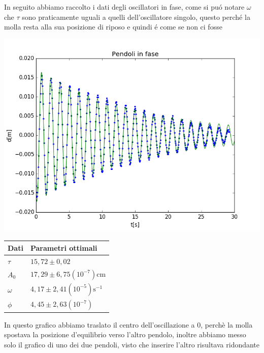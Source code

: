 \documentclass{exam}
\begin{document}
		In seguito abbiamo raccolto i dati degli oscillatori in fase, come si pu\'o notare $\omega$ che $\tau$ sono praticamente uguali a quelli dell'oscillatore singolo, questo perch\'e la molla resta alla sua posizione di riposo e quindi \'e come se non ci fosse\\
		\begin{minipage}{0.5\textwidth}
			\includegraphics[width=\textwidth]{fase}
			\end{minipage}
		\begin{minipage}{0.5\textwidth}
			\begin{tabular}{ll}
				\toprule
				Dati & Parametri ottimali \\
				\midrule
				$\tau$ & $15,72 \pm 0,02$ \\
				$A_{0}$ & $17,29 \pm 6,75(10^{-7})$cm\\
				$\omega$ & $4,17 \pm 2,41(10^{-5})\textrm{s}^{-1}$\\			
				$\phi$ & $4,45 \pm 2,63(10^{-7})$\\
				\bottomrule
			\end{tabular}
		\end{minipage}
		In questo grafico abbiamo traslato il centro dell'oscillazione a 0, perchè la molla spostava la posizione d'equilibrio verso l'altro pendolo, inoltre abbiamo messo solo il grafico di uno dei due pendoli, visto che inserire l'altro risultava ridondante\par \bigskip

\end{document}

